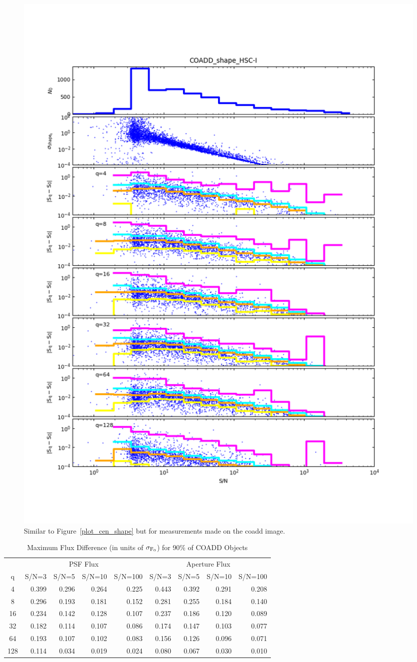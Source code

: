 \begin{figure}[t]
\begin{minipage}{.49\textwidth}
        \includegraphics[width=1.0\textwidth]{figure/plot_coadd_shape_HSC-I.png}
    \end{minipage}
\caption{Similar to Figure~\ref{plot_cen_shape} but for measurements made on the coadd image.}
\label{plot_coadd_cen_shape}
\end{figure}


\begin{table}[hb]
\caption{Maximum Flux Difference (in units of $\sigma_{\rm F_0}$) for 90\% of COADD Objects}
\centering
\begin{tabular}[]{c|rrrr|rrrr}
\hline
     &  \multicolumn{4}{c}{PSF Flux}  & \multicolumn{4}{c}{Aperture Flux} \\
 q   &  S/N=3 & S/N=5 & S/N=10 & S/N=100 & S/N=3 & S/N=5 & S/N=10 & S/N=100  \\
\hline
   4 & 0.399 & 0.296 & 0.264 &  0.225   &  0.443 & 0.392 & 0.291 &  0.208 \\
   8 & 0.296 & 0.193 & 0.181 &  0.152   &  0.281 & 0.255 & 0.184 &  0.140 \\
  16 & 0.234 & 0.142 & 0.128 &  0.107   &  0.237 & 0.186 & 0.120 &  0.089 \\
  32 & 0.182 & 0.114 & 0.107 &  0.086   &  0.174 & 0.147 & 0.103 &  0.077 \\
  64 & 0.193 & 0.107 & 0.102 &  0.083   &  0.156 & 0.126 & 0.096 &  0.071 \\
 128 & 0.114 & 0.034 & 0.019 &  0.024   &  0.080 & 0.067 & 0.030 &  0.010 \\
\hline
\end{tabular}
\label{tab_coadd_flux_diff}
\end{table}



